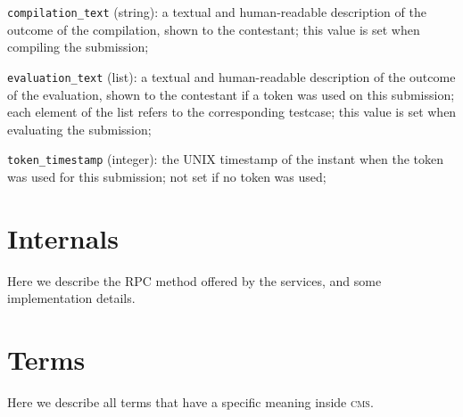 \documentclass[a4paper,8pt]{amsart}
\newcommand{\CMS}{\textsc{cms}}
\newenvironment{squishlist}{%
  \begin{list}{\textbullet}%
    { \setlength{\itemsep}{0pt}%
      \setlength{\parsep}{3pt}%
      \setlength{\topsep}{3pt}%
      \setlength{\partopsep}{0pt}%
      \setlength{\leftmargin}{1.5em}%
      \setlength{\labelwidth}{1em}%
      \setlength{\labelsep}{0.5em} }%
}{\end{list}}
\newcommand{\id}[1]{\texttt{#1}}
\begin{document}
\begin{multicols}{2}
\begin{squishlist}
  \item \id{compilation\_text} (string): a textual and human-readable
    description of the outcome of the compilation, shown to the
    contestant; this value is set when compiling the submission;

  \item \id{evaluation\_text} (list): a textual and human-readable
    description of the outcome of the evaluation, shown to the
    contestant if a token was used on this submission; each element of
    the list refers to the corresponding testcase; this value is set
    when evaluating the submission;

  \item \id{token\_timestamp} (integer): the UNIX timestamp of the
    instant when the token was used for this submission; not set if no
    token was used;

  \end{squishlist}

  \section{Internals}

  Here we describe the RPC method offered by the services, and some
  implementation details.

  \section{Terms}

  Here we describe all terms that have a specific meaning inside \CMS{}.


\end{multicols}
\end{document}
